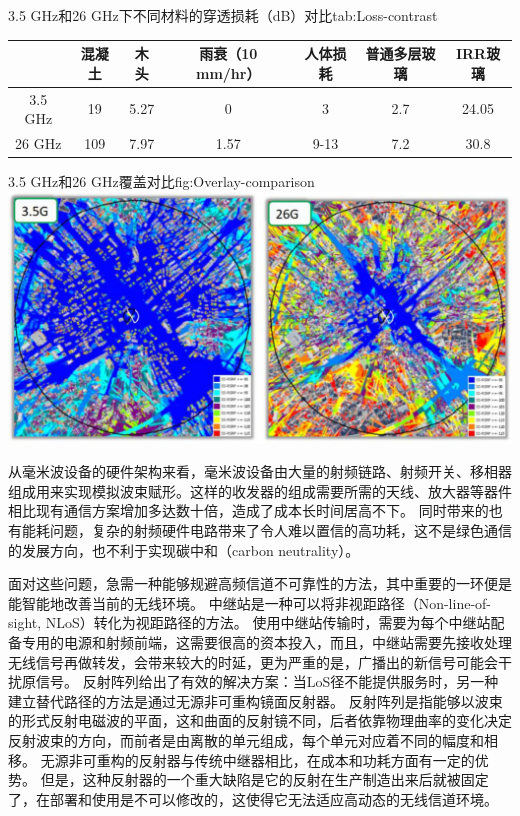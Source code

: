 \documentclass[supercite]{HustGraduPaper}
\begin{document}
\begin{generaltab}{3.5 GHz和26 GHz下不同材料的穿透损耗（dB）对比\cite{ZTE2020}}{tab:Loss-contrast}
	\begin{tabularx}{\textwidth}{ccccccc}
		\toprule
		        & 混凝土 &  木头  & 雨衰（10 mm/hr） & 人体损耗 & 普通多层玻璃 & IRR玻璃 \\ \midrule
		3.5 GHz & 19  & 5.27 &      0       &  3   &  2.7   & 24.05 \\
		26 GHz  & 109 & 7.97 &     1.57     & 9-13 &  7.2   & 30.8  \\ \bottomrule
	\end{tabularx}
\end{generaltab}

\begin{generalfig}[htb]{3.5 GHz和26 GHz覆盖对比\cite{ZTE2020}}{fig:Overlay-comparison}
	\includegraphics[width=0.8\linewidth]{Figures/Overlay-comparison.JPG}
\end{generalfig}

从毫米波设备的硬件架构来看，毫米波设备由大量的射频链路、射频开关、移相器组成用来实现模拟波束赋形。这样的收发器的组成需要所需的天线、放大器等器件相比现有通信方案增加多达数十倍，造成了成本长时间居高不下。
同时带来的也有能耗问题，复杂的射频硬件电路带来了令人难以置信的高功耗，这不是绿色通信的发展方向，也不利于实现碳中和（carbon neutrality）。

面对这些问题，急需一种能够规避高频信道不可靠性的方法，其中重要的一环便是能智能地改善当前的无线环境。
中继站是一种可以将非视距路径（Non-line-of-sight, NLoS）转化为视距路径的方法\cite{Dohler2010a}。
使用中继站传输时，需要为每个中继站配备专用的电源和射频前端，这需要很高的资本投入，而且，中继站需要先接收处理无线信号再做转发，会带来较大的时延，更为严重的是，广播出的新信号可能会干扰原信号\cite{di2020reconfigurable}。
反射阵列给出了有效的解决方案：当LoS径不能提供服务时，另一种建立替代路径的方法是通过无源非可重构镜面反射器。
反射阵列是指能够以波束的形式反射电磁波的平面\cite{huang2005reflectarray}，这和曲面的反射镜不同，后者依靠物理曲率的变化决定反射波束的方向，而前者是由离散的单元组成，每个单元对应着不同的幅度和相移\cite{pozar1997design}。
无源非可重构的反射器与传统中继器相比，在成本和功耗方面有一定的优势。
但是，这种反射器的一个重大缺陷是它的反射在生产制造出来后就被固定了，在部署和使用是不可以修改的，这使得它无法适应高动态的无线信道环境。
\end{document}
